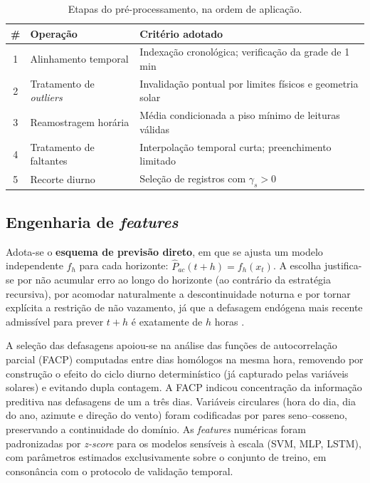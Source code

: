 \begin{table}[htbp]
\centering
\caption{Etapas do pré-processamento, na ordem de aplicação.}
\label{tab:preproc}
\footnotesize
\singlespacing
\renewcommand{\arraystretch}{0.9}
\setlength{\tabcolsep}{4pt}
\begin{tabular}{c p{4cm} p{6cm}}
\toprule
\textbf{\#} & \textbf{Operação} & \textbf{Critério adotado} \\
\midrule
1 & Alinhamento temporal & Indexação cronológica; verificação da grade de 1\,min \\
2 & Tratamento de \textit{outliers} & Invalidação pontual por limites físicos e geometria solar \\
3 & Reamostragem horária & Média condicionada a piso mínimo de leituras válidas \\
4 & Tratamento de faltantes & Interpolação temporal curta; preenchimento limitado \\
5 & Recorte diurno & Seleção de registros com $\gamma_s > 0$ \\
\bottomrule
\end{tabular}
\end{table}

\subsection{Engenharia de \textit{features}}

Adota-se o \textbf{esquema de previsão direto}, em que se ajusta um modelo independente $f_h$ para cada horizonte: $\hat{P}_{ac}(t+h) = f_h(x_t)$. A escolha justifica-se por não acumular erro ao longo do horizonte (ao contrário da estratégia recursiva), por acomodar naturalmente a descontinuidade noturna e por tornar explícita a restrição de não vazamento, já que a defasagem endógena mais recente admissível para prever $t+h$ é exatamente de $h$ horas \citep{taieb2012}.

A seleção das defasagens apoiou-se na análise das funções de autocorrelação parcial (FACP) computadas entre dias homólogos na mesma hora, removendo por construção o efeito do ciclo diurno determinístico (já capturado pelas variáveis solares) e evitando dupla contagem. A FACP indicou concentração da informação preditiva nas defasagens de um a três dias. Variáveis circulares (hora do dia, dia do ano, azimute e direção do vento) foram codificadas por pares seno--cosseno, preservando a continuidade do domínio. As \textit{features} numéricas foram padronizadas por \textit{z-score} para os modelos sensíveis à escala (SVM, MLP, LSTM), com parâmetros estimados exclusivamente sobre o conjunto de treino, em consonância com o protocolo de validação temporal.

